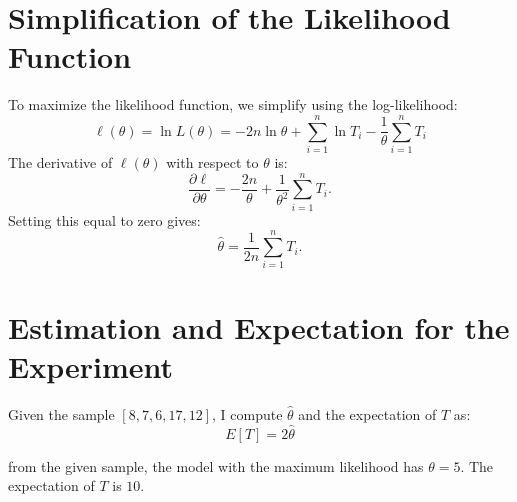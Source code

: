 \section{Simplification of the Likelihood Function}
To maximize the likelihood function, we simplify using the log-likelihood:
\begin{equation}
\ell(\theta) = \ln L(\theta) = -2n \ln \theta + \sum_{i=1}^{n} \ln T_{i} - \frac{1}{\theta} \sum_{i=1}^n T_i
\end{equation}
The derivative of $ \ell(\theta) $ with respect to $ \theta $ is:
\begin{equation}
\frac{\partial \ell}{\partial \theta} = -\frac{2n}{\theta} + \frac{1}{\theta^2} \sum_{i=1}^n T_i.
\end{equation}
Setting this equal to zero gives:
\begin{equation}
\hat{\theta} = \frac{1}{2n} \sum_{i=1}^n T_i.
\end{equation}

\section{Estimation and Expectation for the Experiment}
Given the sample $ [8, 7, 6, 17, 12] $, I compute $ \hat{\theta} $ and the expectation of $ T $ as:
\begin{equation}
E[T] = 2\hat{\theta}
\end{equation}

from the given sample, the model with the maximum likelihood has $ \theta = 5 $. The expectation of $ T $ is $ 10 $.
